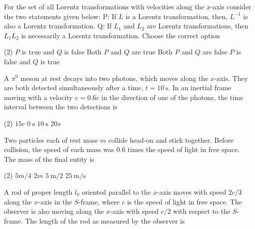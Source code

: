 \begin{enumerate}
\begin{minipage}{\textwidth}
	\item For the set of all Lorentz transformations with velocities along the $x$-axis consider the two statements given below:
	P: If $L$ is a Lorentz transformation, then, $L^{-1}$ is also a Lorentz transformation.
	Q: If $L_{1}$ and $L_{2}$ are Lorentz transformations, then $L_{1} L_{2}$ is necessarily a Lorentz transformation.
	Choose the correct option
\end{minipage}
\begin{tasks}(2)
	\task[\textbf{A.}] $P$ is true and $Q$ is false
	\task[\textbf{B.}]Both $P$ and $Q$ are true
	\task[\textbf{C.}]Both $P$ and $Q$ are false
	\task[\textbf{D.}]$P$ is false and $Q$ is true
\end{tasks}
\begin{minipage}{\textwidth}
	\item A $\pi^{0}$ meson at rest decays into two photons, which moves along the $x$-axis. They are both detected simultaneously after a time, $t=10 \mathrm{~s} .$ In an inertial frame moving with a velocity $v=0.6 c$ in the direction of one of the photons, the time interval between the two detections is
\end{minipage}
\begin{tasks}(2)
	\task[\textbf{A.}] $15 c$
	\task[\textbf{B.}]$0 \mathrm{~s}$
	\task[\textbf{C.}] $10 \mathrm{~s}$
	\task[\textbf{D.}]$20 s$
\end{tasks}	
\begin{minipage}{\textwidth}
	\item Two particles each of rest mass $m$ collide head-on and stick together. Before collision, the speed of each mass was $0.6$ times the speed of light in free space. The mass of the final entity is
\end{minipage}
\begin{tasks}(2)
	\task[\textbf{A.}] $5 m / 4$
	\task[\textbf{B.}]$2 m$
	\task[\textbf{C.}]$5 \mathrm{~m} / 2$
	\task[\textbf{D.}]$25 \mathrm{~m} / \mathrm{s}$
\end{tasks}
\begin{minipage}{\textwidth}
	\item A rod of proper length $l_{0}$ oriented parallel to the $x$-axis moves with speed $2 c / 3$ along the $x$-axis in the $S$-frame, where $c$ is the speed of light in free space. The observer is also moving along the $x$-axis with speed $c / 2$ with respect to the $S$-frame. The length of the rod as measured by the observer is

\end{minipage}
\end{enumerate}
